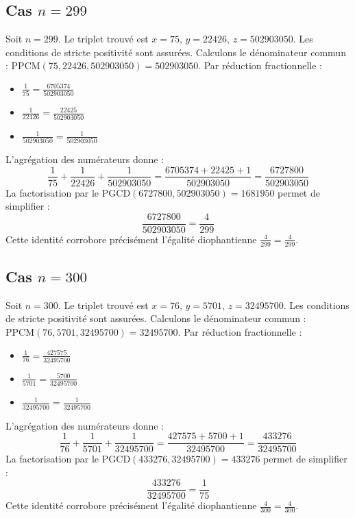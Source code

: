 \documentclass[11pt,a4paper]{article}
\begin{document}
\subsection{Cas $n = 299$}
Soit $n = 299$. Le triplet trouvé est $x = 75$, $y = 22426$, $z = 502903050$.
Les conditions de stricte positivité sont assurées.
Calculons le dénominateur commun : $\text{PPCM}(75, 22426, 502903050) = 502903050$.
Par réduction fractionnelle :
\begin{itemize}
    \item $\frac{1}{75} = \frac{6705374}{502903050}$
    \item $\frac{1}{22426} = \frac{22425}{502903050}$
    \item $\frac{1}{502903050} = \frac{1}{502903050}$
\end{itemize}
L'agrégation des numérateurs donne :
$$ \frac{1}{75} + \frac{1}{22426} + \frac{1}{502903050} = \frac{6705374 + 22425 + 1}{502903050} = \frac{6727800}{502903050} $$
La factorisation par le $\text{PGCD}(6727800, 502903050) = 1681950$ permet de simplifier :
$$ \frac{6727800}{502903050} = \frac{4}{299} $$
Cette identité corrobore précisément l'égalité diophantienne $\frac{4}{299} = \frac{4}{299}$.

\subsection{Cas $n = 300$}
Soit $n = 300$. Le triplet trouvé est $x = 76$, $y = 5701$, $z = 32495700$.
Les conditions de stricte positivité sont assurées.
Calculons le dénominateur commun : $\text{PPCM}(76, 5701, 32495700) = 32495700$.
Par réduction fractionnelle :
\begin{itemize}
    \item $\frac{1}{76} = \frac{427575}{32495700}$
    \item $\frac{1}{5701} = \frac{5700}{32495700}$
    \item $\frac{1}{32495700} = \frac{1}{32495700}$
\end{itemize}
L'agrégation des numérateurs donne :
$$ \frac{1}{76} + \frac{1}{5701} + \frac{1}{32495700} = \frac{427575 + 5700 + 1}{32495700} = \frac{433276}{32495700} $$
La factorisation par le $\text{PGCD}(433276, 32495700) = 433276$ permet de simplifier :
$$ \frac{433276}{32495700} = \frac{1}{75} $$
Cette identité corrobore précisément l'égalité diophantienne $\frac{4}{300} = \frac{4}{300}$.
\end{document}
